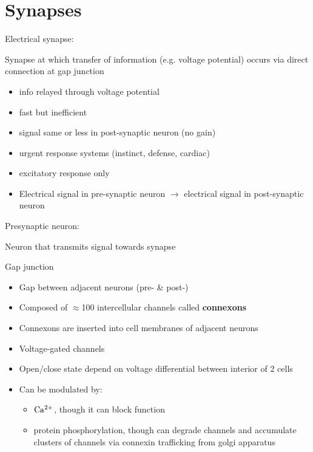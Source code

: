 \documentclass[11pt,fleqn]{book}
\begin{document}
\section{Synapses}
\begin{descriptions}
    \item[Electrical synapse:] 
    \begin{descriptions}
    \end{descriptions}
    Synapse at which transfer of information (e.g. voltage potential) occurs via direct connection at gap junction
    \begin{itemize}
        \item info relayed through voltage potential
        \item fast but inefficient
        \item signal same or less in post-synaptic neuron (no gain)
        \item urgent response systems (instinct, defense, cardiac)
        \item excitatory response only
        \item Electrical signal in pre-synaptic neuron $\rightarrow$ electrical signal in post-synaptic neuron
    \end{itemize}
    \item[Presynaptic neuron:] 
    \begin{descriptions}
    \end{descriptions}
    Neuron that transmits signal towards synapse
    \item[Gap junction]
    \begin{descriptions}
    \end{descriptions}
    \begin{itemize}
        \item Gap between adjacent neurons (pre- \& post-)
        \item Composed of $\approx$100 intercellular channels called \textbf{connexons}
        \item Connexons are inserted into cell membranes of adjacent neurons
        \item Voltage-gated channels
        \item Open/close state depend on voltage differential between interior of 2 cells
        \item Can be modulated by:
        \begin{itemize}
            \item ${\rm Ca^{2+}}$, though it can block function
            \item protein phosphorylation, though can degrade channels and accumulate clusters of channels via connexin trafficking from golgi apparatus

\end{itemize}
\end{itemize}
\end{descriptions}
\end{document}

